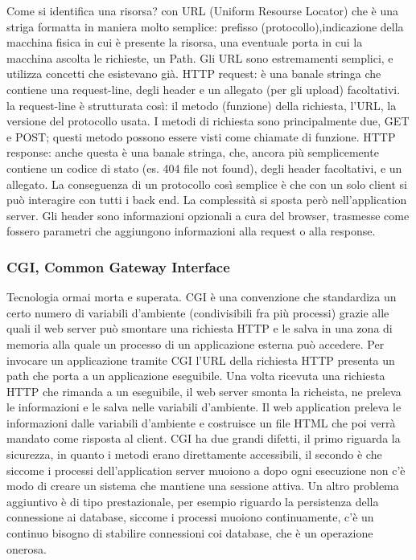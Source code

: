 Come si identifica una risorsa? con URL (Uniform Resourse Locator) che è una striga formatta in maniera molto semplice: prefisso (protocollo),indicazione della macchina fisica in cui è presente la risorsa, una eventuale porta in cui la macchina ascolta le richieste, un Path. Gli URL sono estremamenti semplici, e utilizza concetti che esistevano già.\newline
HTTP request: è una banale stringa che contiene una request-line, degli header e un allegato (per gli upload) facoltativi. la request-line è strutturata così: il metodo (funzione) della richiesta, l'URL, la versione del protocollo usata. I metodi di richiesta sono principalmente due, GET e POST; questi metodo possono essere visti come chiamate di funzione.\newline
HTTP response: anche questa è una banale stringa, che, ancora più semplicemente contiene un codice di stato (es. 404 file not found), degli header facoltativi, e un allegato.\newline
La conseguenza di un protocollo così semplice è che con un solo client si può interagire con tutti i back end. La complessità si sposta però nell'application server.\newline
Gli header sono informazioni opzionali a cura del browser, trasmesse come fossero parametri che aggiungono informazioni alla request o alla response.
\subsubsection{CGI, Common Gateway Interface}
Tecnologia ormai morta e superata.\newline
CGI è una convenzione che standardiza un certo numero di variabili d'ambiente (condivisibili fra più processi) grazie alle quali il web server può smontare una richiesta HTTP e le salva in una zona di memoria alla quale un processo di un applicazione esterna può accedere.\newline
Per invocare un applicazione tramite CGI l'URL della richiesta HTTP presenta un path che porta a un applicazione eseguibile. Una volta ricevuta una richiesta HTTP che rimanda a un eseguibile, il web server smonta la richeista, ne preleva le informazioni e le salva nelle variabili d'ambiente. Il web application preleva le informazioni dalle variabili d'ambiente e costruisce un file HTML che poi verrà mandato come risposta al client.\newline
CGI ha due grandi difetti, il primo riguarda la sicurezza, in quanto i metodi erano direttamente accessibili, il secondo è che siccome i processi dell'application server muoiono a dopo ogni esecuzione non c'è modo di creare un sistema che mantiene una sessione attiva. Un altro problema aggiuntivo è di tipo prestazionale, per esempio riguardo la persistenza della connessione ai database, siccome i processi muoiono continuamente, c'è un continuo bisogno di stabilire connessioni coi database, che è un operazione onerosa.\newline
